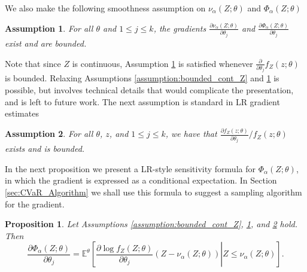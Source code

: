 \documentclass[letterpaper]{article}
\newcommand{\E}{\mathbb{E}}
\newcommand{\cvar}{\Phi_\alpha}
\newcommand{\var}{\nu_\alpha}
\newcommand{\Dth}{\frac{\partial}{\partial \theta_j}}
\newcommand{\Dt}[1]{\frac{\partial {#1}}{\partial \theta_j}}
\newtheorem{assumption}{Assumption}
\newtheorem{proposition}[theorem]{Proposition}
\begin{document}
We also make the following smoothness assumption on $\var (Z;\theta)$ and $\cvar (Z;\theta)$
\begin{assumption}\label{assumption:bounded_derivatives}
For all $\theta$ and $1 \!\leq \!j \!\leq \!k$, the gradients $\Dt{ \var (Z;\theta)}$ and $\Dt{ \cvar (Z;\theta)}$ exist and are bounded.
\end{assumption}
Note that since $Z$ is continuous, Assumption \ref{assumption:bounded_derivatives} is satisfied whenever $\Dth f_Z(z;\theta)$ is bounded. Relaxing Assumptions \ref{assumption:bounded_cont_Z} and \ref{assumption:bounded_derivatives} is possible, but involves technical details that would  complicate the presentation, and is left to future work.
The next assumption is standard in LR gradient estimates
\begin{assumption}\label{assumption:LR_assumption}
For all $\theta$, $z$, and $1 \leq j \leq k$, we have that $\Dt{ f_Z(z;\theta) }/ f_Z(z;\theta)$ exists and is bounded.
\end{assumption}

In the next proposition we present a LR-style sensitivity formula for $\cvar (Z;\theta)$, in which the gradient is expressed as a conditional expectation. In Section \ref{sec:CVaR_Algorithm} we shall use this formula to suggest a sampling algorithm for the gradient.
\begin{proposition}\label{prop:Grad}
Let Assumptions \ref{assumption:bounded_cont_Z}, \ref{assumption:bounded_derivatives}, and \ref{assumption:LR_assumption} hold. Then
\begin{equation*}
\Dt{ \cvar \!(\!Z;\!\theta)} \!=\!
\E^{\theta}\!\left[ \!\left.\Dt{ \log \! f_Z(Z;\theta)}(Z \!-\! \var (Z;\theta)\!)\right|\!Z \!\leq\! \var \!(Z;\!\theta)\! \right]\!\!.
\end{equation*}
\end{proposition}
\end{document}
